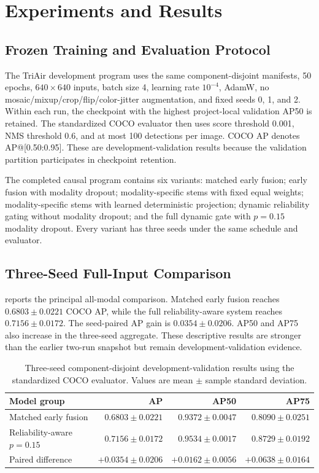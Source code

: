 \section{Experiments and Results}
\subsection{Frozen Training and Evaluation Protocol}
The TriAir development program uses the same component-disjoint manifests, 50 epochs, $640\times640$ inputs, batch size 4, learning rate $10^{-4}$, AdamW, no mosaic/mixup/crop/flip/color-jitter augmentation, and fixed seeds 0, 1, and 2. Within each run, the checkpoint with the highest project-local validation AP50 is retained. The standardized COCO evaluator then uses score threshold 0.001, NMS threshold 0.6, and at most 100 detections per image. COCO AP denotes AP@[0.50:0.95]. These are development-validation results because the validation partition participates in checkpoint retention.

The completed causal program contains six variants: matched early fusion; early fusion with modality dropout; modality-specific stems with fixed equal weights; modality-specific stems with learned deterministic projection; dynamic reliability gating without modality dropout; and the full dynamic gate with $p=0.15$ modality dropout. Every variant has three seeds under the same schedule and evaluator.

\subsection{Three-Seed Full-Input Comparison}
 reports the principal all-modal comparison. Matched early fusion reaches $0.6803\pm0.0221$ COCO AP, while the full reliability-aware system reaches $0.7156\pm0.0172$. The seed-paired AP gain is $0.0354\pm0.0206$. AP50 and AP75 also increase in the three-seed aggregate. These descriptive results are stronger than the earlier two-run snapshot but remain development-validation evidence.

\begin{table}[t]
\centering
\caption{Three-seed component-disjoint development-validation results using the standardized COCO evaluator. Values are mean $\pm$ sample standard deviation.}
\label{tab:core}
\small
\begin{tabular}{@{}lrrr@{}}
\toprule
Model group & AP & AP50 & AP75\\
\midrule
Matched early fusion & $0.6803\pm0.0221$ & $0.9372\pm0.0047$ & $0.8090\pm0.0251$\\
Reliability-aware $p=0.15$ & $\mathbf{0.7156\pm0.0172}$ & $\mathbf{0.9534\pm0.0017}$ & $\mathbf{0.8729\pm0.0192}$\\
Paired difference & $+0.0354\pm0.0206$ & $+0.0162\pm0.0056$ & $+0.0638\pm0.0164$\\
\bottomrule
\end{tabular}
\end{table}


